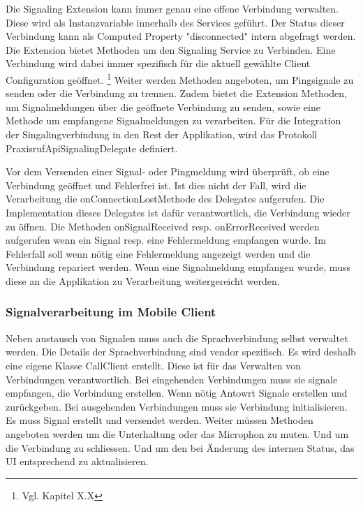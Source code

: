 Die Signaling Extension kann immer genau eine offene Verbindung verwalten.
Diese wird als Instanzvariable innerhalb des Services geführt.
Der Status dieser Verbindung kann als Computed Property "disconnected" intern abgefragt werden.
Die Extension bietet Methoden um den Signaling Service zu Verbinden.
Eine Verbindung wird dabei immer spezifisch für die aktuell gewählte Client Configuration geöffnet. \footnote{Vgl. Kapitel X.X}
Weiter werden Methoden angeboten, um Pingsignale zu senden oder die Verbindung zu trennen.
Zudem bietet die Extension Methoden, um Signalmeldungen über die geöffnete Verbindung zu senden,
sowie eine Methode um empfangene Signalmeldungen zu verarbeiten.
Für die Integration der Singalingverbindung in den Rest der Applikation, wird das Protokoll PraxisrufApiSignalingDelegate definiert.

Vor dem Versenden einer Signal- oder Pingmeldung wird überprüft, ob eine Verbindung geöffnet und Fehlerfrei ist.
Ist dies nicht der Fall, wird die Verarbeitung die onConnectionLostMethode des Delegates aufgerufen.
Die Implementation dieses Delegates ist dafür verantwortlich, die Verbindung wieder zu öffnen.
Die Methoden onSignalReceived resp. onErrorReceived werden aufgerufen wenn ein Signal resp. eine Fehlermeldung empfangen wurde.
Im Fehlerfall soll wenn nötig eine Fehlermeldung angezeigt werden und die Verbindung repariert werden.
Wenn eine Signalmeldung empfangen wurde, muss diese an die Applikation zu Verarbeitung weitergereicht werden.

\clearpage

\subsubsection{Signalverarbeitung im Mobile Client}

Neben austausch von Signalen muss auch die Sprachverbindung selbst verwaltet werden.
Die Details der Sprachverbindung sind vendor spezifisch.
Es wird deshalb eine eigene Klasse CallClient erstellt.
Diese ist für das Verwalten von Verbindungen verantwortlich.
Bei eingehenden Verbindungen muss sie signale empfangen, die Verbindung erstellen.
Wenn nötig Antowrt Signale erstellen und zurückgeben.
Bei ausgehenden Verbindungen muss sie Verbindung initialisieren.
Es muss Signal erstellt und versendet werden.
Weiter müssen Methoden angeboten werden um die Unterhaltung oder das Microphon zu muten.
Und um die Verbindung zu schliessen.
Und um den bei Änderung des internen Status, das UI entsprechend zu aktualisieren.

